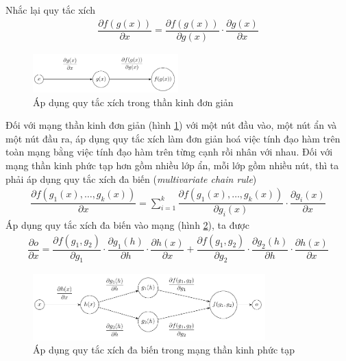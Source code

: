 Nhắc lại quy tắc xích
\begin{align}
    \dfrac{\partial f(g(x))}{\partial x} = \dfrac{\partial f(g(x))}{\partial g(x)}\cdot\dfrac{\partial g(x)}{\partial x}
\end{align}
\begin{figure}[htb]
    \centering
    \includegraphics[width=0.5\textwidth]{tikz_image/chain_rule.pdf}
    \caption{Áp dụng quy tắc xích trong thần kinh đơn giản}
    \label{figure:chain-rule-nn}
\end{figure}
Đối với mạng thần kinh đơn giản (hình \ref{figure:chain-rule-nn}) với một nút đầu vào, một nút ẩn và một nút đầu ra, áp dụng quy tắc xích làm đơn giản hoá việc tính đạo hàm trên toàn mạng bằng việc tính đạo hàm trên từng cạnh rồi nhân với nhau. Đối với mạng thần kinh phức tạp hơn gồm nhiều lớp ẩn, mỗi lớp gồm nhiều nút, thì ta phải áp dụng quy tắc xích đa biến (\textit{multivariate chain rule})
\begin{align}
    \dfrac{\partial f(g_1(x),\dots,g_k(x))}{\partial x} = \sum^k_{i=1}\dfrac{\partial f(g_1(x),\dots,g_k(x))}{\partial g_i(x)}\cdot\dfrac{\partial g_i(x)}{\partial x}
\end{align}
Áp dụng quy tắc xích đa biến vào mạng (hình \ref{figure:multivariate-chain-rule-nn}), ta được
\begin{align}
    \label{equation:multivariate-chain-rule-nn}
    \dfrac{\partial o}{\partial x}=
    \dfrac{\partial f(g_1,g_2)}{\partial g_1}\cdot\dfrac{\partial g_1(h)}{\partial h}\cdot\dfrac{\partial h(x)}{\partial x}
    +\dfrac{\partial f(g_1,g_2)}{\partial g_2}\cdot\dfrac{\partial g_2(h)}{\partial h}\cdot\dfrac{\partial h(x)}{\partial x}
\end{align}
\begin{figure}[htb]
    \centering
    \includegraphics[width=0.8\textwidth]{tikz_image/multivariate_chain_rule.pdf}
    \caption{Áp dụng quy tắc xích đa biến trong mạng thần kinh phức tạp}
    \label{figure:multivariate-chain-rule-nn}
\end{figure}


